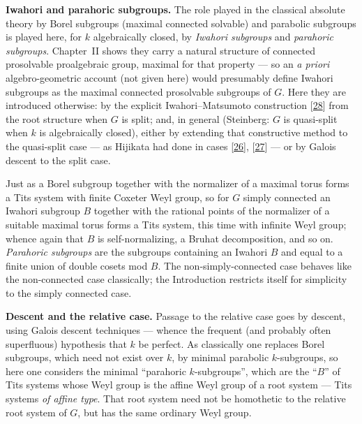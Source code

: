 \documentclass[12pt,a4paper,oneside,english]{smfart}
\newcommand{\btbib}[1]{\hyperlink{bib:#1}{#1}}
\theoremstyle{definition}
\theoremstyle{bt}
\begin{document}
\medskip
\noindent\textbf{Iwahori and parahoric subgroups.} The role played in the
classical absolute theory by Borel subgroups (maximal connected solvable) and parabolic subgroups is played here, for $k$ algebraically closed, by
\emph{Iwahori subgroups} and \emph{parahoric subgroups}. Chapter~II shows they
carry a natural structure of connected prosolvable proalgebraic group, maximal for that property --- so an \emph{a priori} algebro-geometric account (not given here) would presumably define Iwahori subgroups as the maximal connected prosolvable subgroups of $G$. Here they are introduced otherwise: by the explicit Iwahori--Matsumoto construction [\btbib{28}] from the root structure when $G$ is split; and, in general (Steinberg: $G$ is quasi-split when $k$ is algebraically closed), either by extending that constructive method to the quasi-split case --- as Hijikata had done in cases [\btbib{26}], [\btbib{27}] --- or by Galois descent to the split case.

Just as a Borel subgroup together with the normalizer of a maximal torus forms a Tits system with finite Coxeter Weyl group, so for $G$ simply connected an Iwahori subgroup $B$ together with the rational points of the normalizer of a suitable maximal torus forms a Tits system, this time with infinite Weyl group; whence again that $B$ is self-normalizing, a Bruhat decomposition, and so on. \emph{Parahoric subgroups} are the subgroups containing an Iwahori $B$ and equal to a finite union of double cosets mod $B$. The non-simply-connected case behaves like the non-connected case classically; the Introduction restricts itself for simplicity to the simply connected case.

\medskip
\noindent\textbf{Descent and the relative case.} Passage to the relative case
goes by descent, using Galois descent techniques --- whence the frequent (and probably often superfluous) hypothesis that $k$ be perfect. As classically one replaces Borel subgroups, which need not exist over $k$, by minimal parabolic $k$-subgroups, so here one considers the minimal ``parahoric $k$-subgroups'', which are the ``$B$'' of Tits systems whose Weyl group is the affine Weyl group of a root system --- Tits systems \emph{of affine type}. That root system need not be homothetic to the relative root system of $G$, but has the same ordinary Weyl group.
\end{document}
